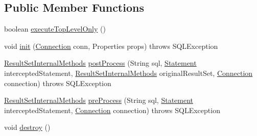 \subsection*{Public Member Functions}
\begin{DoxyCompactItemize}
\item 
boolean \mbox{\hyperlink{classcom_1_1mysql_1_1jdbc_1_1interceptors_1_1_session_association_interceptor_ad6d29d0b26ce2453c949e2cdffa8be49}{execute\+Top\+Level\+Only}} ()
\item 
void \mbox{\hyperlink{classcom_1_1mysql_1_1jdbc_1_1interceptors_1_1_session_association_interceptor_a525a3bac6a24ac0af33c1c1f1961f669}{init}} (\mbox{\hyperlink{interfacecom_1_1mysql_1_1jdbc_1_1_connection}{Connection}} conn, Properties props)  throws S\+Q\+L\+Exception 
\item 
\mbox{\hyperlink{interfacecom_1_1mysql_1_1jdbc_1_1_result_set_internal_methods}{Result\+Set\+Internal\+Methods}} \mbox{\hyperlink{classcom_1_1mysql_1_1jdbc_1_1interceptors_1_1_session_association_interceptor_aff86319f01d91f3ff73d649bd50a31d4}{post\+Process}} (String sql, \mbox{\hyperlink{interfacecom_1_1mysql_1_1jdbc_1_1_statement}{Statement}} intercepted\+Statement, \mbox{\hyperlink{interfacecom_1_1mysql_1_1jdbc_1_1_result_set_internal_methods}{Result\+Set\+Internal\+Methods}} original\+Result\+Set, \mbox{\hyperlink{interfacecom_1_1mysql_1_1jdbc_1_1_connection}{Connection}} connection)  throws S\+Q\+L\+Exception 
\item 
\mbox{\hyperlink{interfacecom_1_1mysql_1_1jdbc_1_1_result_set_internal_methods}{Result\+Set\+Internal\+Methods}} \mbox{\hyperlink{classcom_1_1mysql_1_1jdbc_1_1interceptors_1_1_session_association_interceptor_a386ee45fd7e7555e2d0a5086ba22280f}{pre\+Process}} (String sql, \mbox{\hyperlink{interfacecom_1_1mysql_1_1jdbc_1_1_statement}{Statement}} intercepted\+Statement, \mbox{\hyperlink{interfacecom_1_1mysql_1_1jdbc_1_1_connection}{Connection}} connection)  throws S\+Q\+L\+Exception 
\item 
void \mbox{\hyperlink{classcom_1_1mysql_1_1jdbc_1_1interceptors_1_1_session_association_interceptor_a4ec0e8dc4e3cac14db72e76f82ddae56}{destroy}} ()
\end{DoxyCompactItemize}
